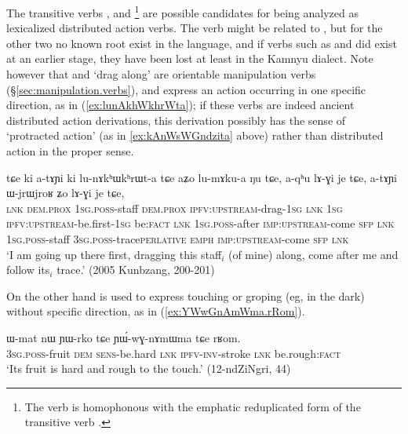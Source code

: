 The transitive verbs ,  and \footnote{The verb  is homophonous with the emphatic reduplicated form of the transitive verb . } are possible candidates for being analyzed as lexicalized distributed action verbs. The verb  might be related to , but for the other two no known root exist in the language, and if verbs such as  and  did exist at an earlier stage, they have been lost at least in the Kamnyu dialect. Note however that  and  `drag along' are orientable manipulation verbs (§\ref{sec:manipulation.verbs}), and express an action occurring in one specific direction, as in (\ref{ex:lunAkhWkhrWta}); if these verbs are indeed ancient distributed action derivations, this derivation possibly has the sense of `protracted action' (as in \ref{ex:kAnWsWGndzita}  above) rather than distributed action in the proper sense.

\begin{exe}
\ex \label{ex:lunAkhWkhrWta}
\gll tɕe ki a-tɤɲi ki lu-nɤkʰɯkʰrɯt-a tɕe aʑo lu-mɤku-a ŋu tɕe, a-qʰu lɤ-ɣi je tɕe, a-tɤɲi ɯ-jrɯ\redp{}jroʁ ʑo lɤ-ɣi je tɕe, \\
\textsc{lnk} \textsc{dem}.\textsc{prox} \textsc{1sg}.\textsc{poss}-staff \textsc{dem}.\textsc{prox} \textsc{ipfv}:\textsc{upstream}-drag-\textsc{1sg} \textsc{lnk} \textsc{1sg} \textsc{ipfv}:\textsc{upstream}-be.first-\textsc{1sg} be:\textsc{fact} \textsc{lnk} \textsc{1sg}.\textsc{poss}-after \textsc{imp}:\textsc{upstream}-come \textsc{sfp} \textsc{lnk} \textsc{1sg}.\textsc{poss}-staff \textsc{3sg}.\textsc{poss}-trace\redp{}\textsc{perlative} \textsc{emph} \textsc{imp}:\textsc{upstream}-come \textsc{sfp} \textsc{lnk} \\
\glt `I am going up there first, dragging this staff$_i$ (of mine) along, come after me and follow its$_i$ trace.' (2005 Kunbzang, 200-201)
\end{exe}

On the other hand  is used to express touching or groping (eg, in the dark) without specific direction, as in (\ref{ex:YWwGnAmWma.rRom}).

\begin{exe}
\ex \label{ex:YWwGnAmWma.rRom}
\gll ɯ-mat nɯ ɲɯ-rko tɕe ɲɯ́-wɣ-nɤmɯma tɕe rʁom.\\
\textsc{3sg}.\textsc{poss}-fruit \textsc{dem} \textsc{sens}-be.hard \textsc{lnk} \textsc{ipfv}-\textsc{inv}-stroke \textsc{lnk} be.rough:\textsc{fact}\\
\glt `Its fruit is hard and rough to the touch.' (12-ndZiNgri, 44)
\end{exe}

